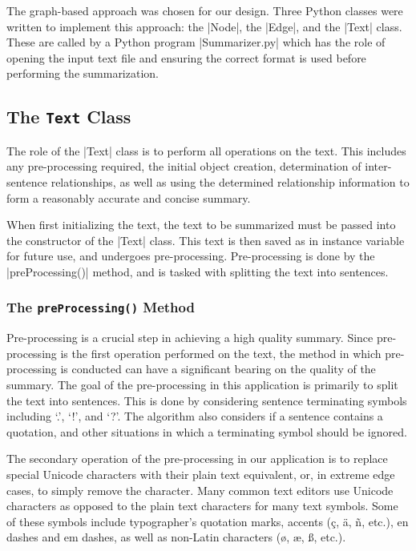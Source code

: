 
The graph-based approach was chosen for our design. Three Python classes were written to implement this approach: the |Node|, the |Edge|, and the |Text| class. These are called by a Python program |Summarizer.py| which has the role of opening the input text file and ensuring the correct format is used before performing the summarization.


\subsection{The {\tt Text} Class}
	The role of the |Text| class is to perform all operations on the text. This includes any pre-processing required, the initial object creation, determination of inter-sentence relationships, as well as using the determined relationship information to form a reasonably accurate and concise summary.
	
	When first initializing the text, the text to be summarized must be passed into the constructor of the |Text| class. This text is then saved as in instance variable for future use, and undergoes pre-processing. Pre-processing is done by the |preProcessing()| method, and is tasked with splitting the text into sentences.
	
	\subsubsection{The {\tt preProcessing()} Method}
		Pre-processing is a crucial step in achieving a high quality summary. Since pre-processing is the first operation performed on the text, the method in which pre-processing is conducted can have a significant bearing on the quality of the summary. The goal of the pre-processing in this application is primarily to split the text into sentences. This is done by considering sentence terminating symbols including `.', `!', and `?'. The algorithm also considers if a sentence contains a quotation, and other situations in which a terminating symbol should be ignored.
		
		The secondary operation of the pre-processing in our application is to replace special Unicode characters with their plain text equivalent, or, in extreme edge cases, to simply remove the character. Many common text editors use Unicode characters as opposed to the plain text characters for many text symbols. Some of these symbols include typographer's quotation marks, accents (\eg \c c, \"a, \~n, etc.), en dashes and em dashes, as well as non-Latin characters (\eg \o, \ae, \ss, etc.). 
		
